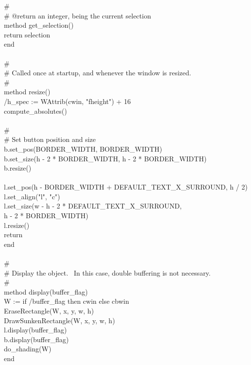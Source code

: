 {\>\# \\
\>\# @return an integer, being the current selection \\
\>method get\_selection() \\
\>\>return selection \\
\>end \\
\ \\
\>\# \\
\>\# Called once at startup, and whenever the window is resized. \\
\>\# \\
\>method resize() \\
\>\>/h\_spec := WAttrib(cwin, "fheight") + 16 \\
\>\>compute\_absolutes() \\
\ \\
\>\>\# \\
\>\>\# Set button position and size \\
\>\>b.set\_pos(BORDER\_WIDTH, BORDER\_WIDTH) \\
\>\>b.set\_size(h - 2 * BORDER\_WIDTH, h - 2 * BORDER\_WIDTH) \\
\>\>b.resize() \\
\ \\
\>\>l.set\_pos(h - BORDER\_WIDTH + DEFAULT\_TEXT\_X\_SURROUND, h / 2) \\
\>\>l.set\_align("l", "c") \\
\>\>l.set\_size(w - h - 2 * DEFAULT\_TEXT\_X\_SURROUND, \\
\>\>\>\>\>h - 2 * BORDER\_WIDTH) \\
\>\>l.resize() \\
\>\>return \\
\>end \\
\ \\
\>\# \\
\>\# Display the object. \ In this case, double buffering is not necessary.\\
\>\# \\
\>method display(buffer\_flag) \\
\>\>W := if /buffer\_flag then cwin else cbwin \\
\>\>EraseRectangle(W, x, y, w, h) \\
\>\>DrawSunkenRectangle(W, x, y, w, h) \\
\>\>l.display(buffer\_flag) \\
\>\>b.display(buffer\_flag) \\
\>\>do\_shading(W) \\
\>end \\
}
